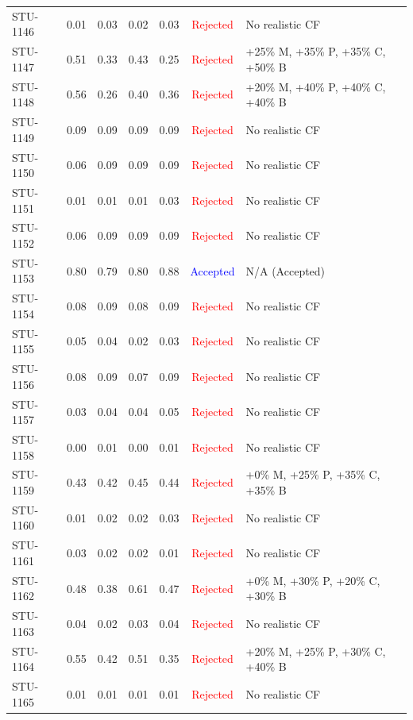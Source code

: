 \begin{longtable}{l c c c c | c | l}
STU-1146 & 0.01 & 0.03 & 0.02 & 0.03 & \textcolor{red}{Rejected} & No realistic CF \\
STU-1147 & 0.51 & 0.33 & 0.43 & 0.25 & \textcolor{red}{Rejected} & +25\% M, +35\% P, +35\% C, +50\% B \\
STU-1148 & 0.56 & 0.26 & 0.40 & 0.36 & \textcolor{red}{Rejected} & +20\% M, +40\% P, +40\% C, +40\% B \\
STU-1149 & 0.09 & 0.09 & 0.09 & 0.09 & \textcolor{red}{Rejected} & No realistic CF \\
STU-1150 & 0.06 & 0.09 & 0.09 & 0.09 & \textcolor{red}{Rejected} & No realistic CF \\
STU-1151 & 0.01 & 0.01 & 0.01 & 0.03 & \textcolor{red}{Rejected} & No realistic CF \\
STU-1152 & 0.06 & 0.09 & 0.09 & 0.09 & \textcolor{red}{Rejected} & No realistic CF \\
STU-1153 & 0.80 & 0.79 & 0.80 & 0.88 & \textcolor{blue}{Accepted} & N/A (Accepted) \\
STU-1154 & 0.08 & 0.09 & 0.08 & 0.09 & \textcolor{red}{Rejected} & No realistic CF \\
STU-1155 & 0.05 & 0.04 & 0.02 & 0.03 & \textcolor{red}{Rejected} & No realistic CF \\
STU-1156 & 0.08 & 0.09 & 0.07 & 0.09 & \textcolor{red}{Rejected} & No realistic CF \\
STU-1157 & 0.03 & 0.04 & 0.04 & 0.05 & \textcolor{red}{Rejected} & No realistic CF \\
STU-1158 & 0.00 & 0.01 & 0.00 & 0.01 & \textcolor{red}{Rejected} & No realistic CF \\
STU-1159 & 0.43 & 0.42 & 0.45 & 0.44 & \textcolor{red}{Rejected} & +0\% M, +25\% P, +35\% C, +35\% B \\
STU-1160 & 0.01 & 0.02 & 0.02 & 0.03 & \textcolor{red}{Rejected} & No realistic CF \\
STU-1161 & 0.03 & 0.02 & 0.02 & 0.01 & \textcolor{red}{Rejected} & No realistic CF \\
STU-1162 & 0.48 & 0.38 & 0.61 & 0.47 & \textcolor{red}{Rejected} & +0\% M, +30\% P, +20\% C, +30\% B \\
STU-1163 & 0.04 & 0.02 & 0.03 & 0.04 & \textcolor{red}{Rejected} & No realistic CF \\
STU-1164 & 0.55 & 0.42 & 0.51 & 0.35 & \textcolor{red}{Rejected} & +20\% M, +25\% P, +30\% C, +40\% B \\
STU-1165 & 0.01 & 0.01 & 0.01 & 0.01 & \textcolor{red}{Rejected} & No realistic CF \\

\end{longtable}

